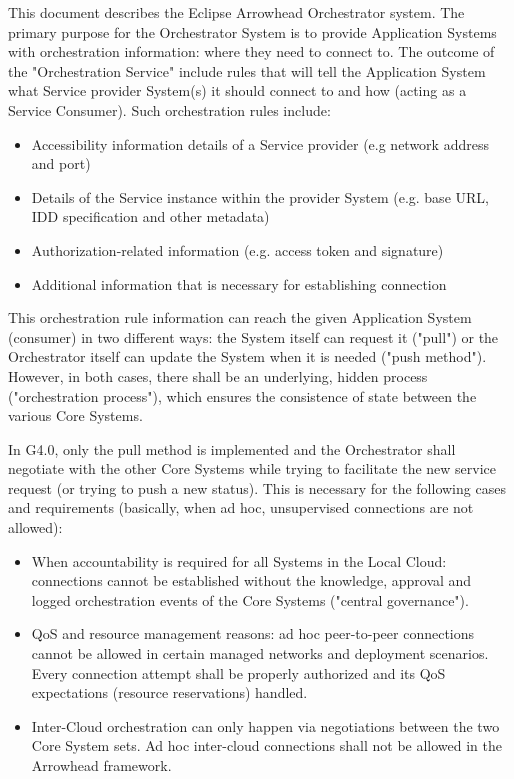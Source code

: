 \documentclass[a4paper]{arrowhead}
\begin{document}
This document describes the Eclipse Arrowhead Orchestrator system. 
The primary purpose for the Orchestrator System is to provide Application Systems with orchestration information: where they need to connect to. The outcome of the "Orchestration Service" include rules that will tell the Application System what Service provider System(s) it should connect to and how (acting as a Service Consumer). Such orchestration rules include:

\begin{itemize}
    \item Accessibility information details of a Service provider (e.g network address and port)
    \item Details of the Service instance within the provider System (e.g. base URL, IDD specification and other metadata)
    \item Authorization-related information (e.g. access token and signature)
    \item Additional information that is necessary for establishing connection
\end{itemize}

This orchestration rule information can reach the given Application System (consumer) in two different ways: the System itself can request it ("pull") or the Orchestrator itself can update the System when it is needed ("push method"). However, in both cases, there shall be an underlying, hidden process ("orchestration process"), which ensures the consistence of state between the various Core Systems.

In G4.0, only the pull method is implemented and the Orchestrator shall negotiate with the other Core Systems while trying to facilitate the new service request (or trying to push a new status). This is necessary for the following cases and requirements (basically, when ad hoc, unsupervised connections are not allowed):

\begin{itemize}
    \item When accountability is required for all Systems in the Local Cloud: connections cannot be established without the knowledge, approval and logged orchestration events of the Core Systems ("central governance").
    \item QoS and resource management reasons: ad hoc peer-to-peer connections cannot be allowed in certain managed networks and deployment scenarios. Every connection attempt shall be properly authorized and its QoS expectations (resource reservations) handled.
    \item Inter-Cloud orchestration can only happen via negotiations between the two Core System sets. Ad hoc inter-cloud connections shall not be allowed in the Arrowhead framework.
\end{itemize}
\end{document}
